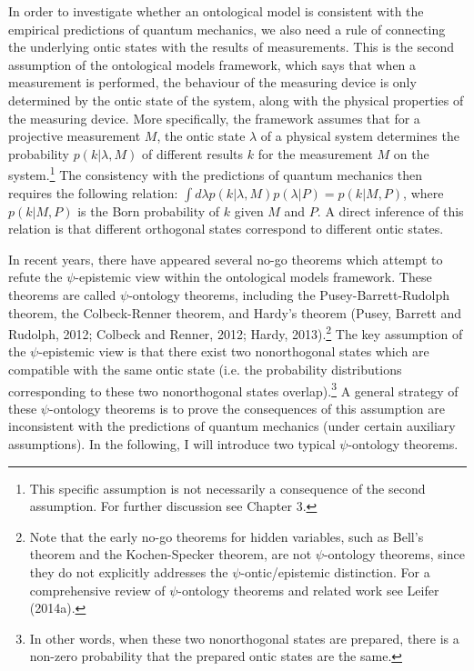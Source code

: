 In order to investigate whether an ontological model is consistent with the empirical predictions of quantum mechanics, we also need a rule of connecting the underlying ontic states with the results of measurements. This is the second assumption of the ontological models framework, which says that when a measurement is performed, the behaviour of the measuring device is only determined by the ontic state of the system, along with the physical properties of the measuring device. More specifically, the framework assumes that for a projective measurement $M$, the ontic state $\lambda$ of a physical system determines the probability $p(k|\lambda,M)$ of different results $k$ for the measurement $M$ on the system.\footnote{This specific assumption is not necessarily a consequence of the second assumption. For further discussion see Chapter 3.} The consistency with the predictions of quantum mechanics then requires the following relation: $\int{d\lambda p(k|\lambda, M)p(\lambda|P)} = p(k|M, P)$, where $p(k|M, P)$ is the Born probability of $k$ given $M$ and $P$. A direct inference of this relation is that different orthogonal states correspond to different ontic states.

In recent years, there have appeared several no-go theorems which attempt to refute the $\psi$-epistemic view within the ontological models framework. These theorems are called $\psi$-ontology theorems, including the Pusey-Barrett-Rudolph theorem, the Colbeck-Renner theorem, and Hardy's theorem (Pusey, Barrett and Rudolph, 2012; Colbeck and Renner, 2012; Hardy, 2013).\footnote{Note that the early no-go theorems for hidden variables, such as Bell's theorem and the Kochen-Specker theorem, are not $\psi$-ontology theorems, since they do not explicitly addresses the $\psi$-ontic/epistemic distinction. For a comprehensive review of $\psi$-ontology theorems and related work see Leifer (2014a).} The key assumption of the $\psi$-epistemic view is that there exist two nonorthogonal states which are compatible with the same ontic state (i.e. the probability distributions corresponding to these two nonorthogonal states overlap).\footnote{In other words, when these two nonorthogonal states are prepared, there is a non-zero probability that the prepared ontic states are the same.} A general strategy of these $\psi$-ontology theorems is to prove the consequences of this assumption are inconsistent with the predictions of quantum mechanics (under certain auxiliary assumptions). In the following, I will introduce two typical $\psi$-ontology theorems. 

